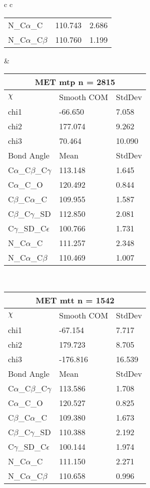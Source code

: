 \begin{longtable}{ c c }
\begin{tabular}{ l l l }
  N\_C$\alpha$\_C & 110.743 & 2.686\\
  N\_C$\alpha$\_C$\beta$ & 110.760 & 1.199\\
  \bottomrule
  \end{tabular}
  &
  \begin{tabular}{ l l l }
  \toprule
  \multicolumn{3}{c}{MET \textbf{mtp} n = 2815} \\ \toprule
  $\chi$       & Smooth COM & StdDev \\ \midrule
  chi1 & -66.650 & 7.058 \\ 
  chi2 & 177.074 & 9.262 \\ 
  chi3 & 70.464 & 10.090 \\ \midrule
  Bond Angle   & Mean     & StdDev \\ \midrule
  C$\alpha$\_C$\beta$\_C$\gamma$ & 113.148 & 1.645\\
  C$\alpha$\_C\_O & 120.492 & 0.844\\
  C$\beta$\_C$\alpha$\_C & 109.955 & 1.587\\
  C$\beta$\_C$\gamma$\_SD & 112.850 & 2.081\\
  C$\gamma$\_SD\_C$\epsilon$ & 100.766 & 1.731\\
  N\_C$\alpha$\_C & 111.257 & 2.348\\
  N\_C$\alpha$\_C$\beta$ & 110.469 & 1.007\\
  \bottomrule
  \end{tabular}
  \\
  \begin{tabular}{ l l l }
  \toprule
  \multicolumn{3}{c}{MET \textbf{mtt} n = 1542} \\ \toprule
  $\chi$       & Smooth COM & StdDev \\ \midrule
  chi1 & -67.154 & 7.717 \\ 
  chi2 & 179.723 & 8.705 \\ 
  chi3 & -176.816 & 16.539 \\ \midrule
  Bond Angle   & Mean     & StdDev \\ \midrule
  C$\alpha$\_C$\beta$\_C$\gamma$ & 113.586 & 1.708\\
  C$\alpha$\_C\_O & 120.527 & 0.825\\
  C$\beta$\_C$\alpha$\_C & 109.380 & 1.673\\
  C$\beta$\_C$\gamma$\_SD & 110.388 & 2.192\\
  C$\gamma$\_SD\_C$\epsilon$ & 100.144 & 1.974\\
  N\_C$\alpha$\_C & 111.150 & 2.271\\
  N\_C$\alpha$\_C$\beta$ & 110.658 & 0.996\\

\end{tabular}
\end{longtable}
